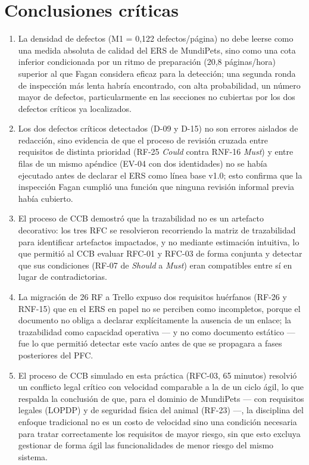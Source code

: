 \documentclass[journal,onecolumn]{IEEEtran}
\begin{document}
	\section{Conclusiones críticas}
	\label{sec:conclusiones}
	
	\begin{enumerate}[label=\arabic*.]
		\item La densidad de defectos (M1 = 0,122 defectos/página) no
		debe leerse como una medida absoluta de calidad del ERS de
		MundiPets, sino como una cota inferior condicionada por un
		ritmo de preparación (20,8 páginas/hora) superior al que Fagan
		considera eficaz para la detección; una segunda ronda de
		inspección más lenta habría encontrado, con alta probabilidad,
		un número mayor de defectos, particularmente en las secciones
		no cubiertas por los dos defectos críticos ya localizados.
		\item Los dos defectos críticos detectados (D-09 y D-15) no son
		errores aislados de redacción, sino evidencia de que el
		proceso de revisión cruzada entre requisitos de distinta
		prioridad (RF-25 \emph{Could} contra RNF-16 \emph{Must}) y
		entre filas de un mismo apéndice (EV-04 con dos identidades)
		no se había ejecutado antes de declarar el ERS como línea
		base v1.0; esto confirma que la inspección Fagan cumplió una
		función que ninguna revisión informal previa había cubierto.
		\item El proceso de CCB demostró que la trazabilidad no es un
		artefacto decorativo: los tres RFC se resolvieron recorriendo
		la matriz de trazabilidad para identificar artefactos
		impactados, y no mediante estimación intuitiva, lo que
		permitió al CCB evaluar RFC-01 y RFC-03 de forma conjunta y
		detectar que sus condiciones (RF-07 de \emph{Should} a
		\emph{Must}) eran compatibles entre sí en lugar de
		contradictorias.
		\item La migración de 26 RF a Trello expuso dos requisitos
		huérfanos (RF-26 y RNF-15) que en el ERS en papel no se
		perciben como incompletos, porque el documento no obliga a
		declarar explícitamente la ausencia de un enlace; la
		trazabilidad como capacidad operativa --- y no como documento
		estático --- fue lo que permitió detectar este vacío antes de
		que se propagara a fases posteriores del PFC.
		\item El proceso de CCB simulado en esta práctica (RFC-03, 65
		minutos) resolvió un conflicto legal crítico con velocidad
		comparable a la de un ciclo ágil, lo que respalda la
		conclusión de que, para el dominio de MundiPets --- con
		requisitos legales (LOPDP) y de seguridad física del animal
		(RF-23) ---, la disciplina del enfoque tradicional no es un
		costo de velocidad sino una condición necesaria para tratar
		correctamente los requisitos de mayor riesgo, sin que esto
		excluya gestionar de forma ágil las funcionalidades de menor
		riesgo del mismo sistema.
	\end{enumerate}
	
\end{document}
